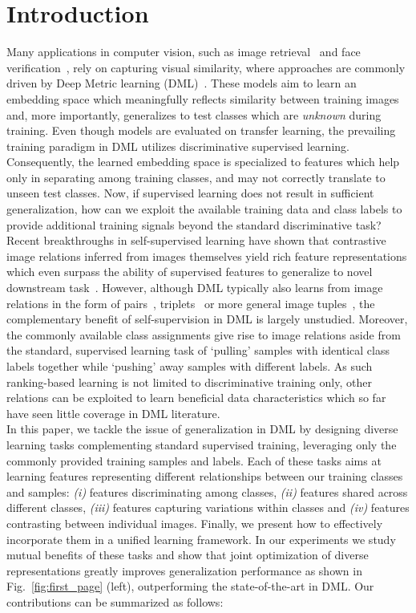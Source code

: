 \documentclass[runningheads]{llncs}
\begin{document}
\section{Introduction}
Many applications in computer vision, such as image retrieval~\cite{proxynca,dvml,margin} and face verification~\cite{semihard,npairs}, rely on capturing visual similarity, where approaches are commonly driven by Deep Metric learning (DML)~\cite{npairs,margin,proxynca}. These models aim to learn an embedding space which meaningfully reflects similarity between training images and, more importantly, generalizes to test classes which are \textit{unknown} during training. Even though models are evaluated on transfer learning, the prevailing training paradigm in DML utilizes discriminative supervised learning. Consequently, the learned embedding space is specialized to features which help only in separating among training classes, and may not correctly translate to unseen test classes. 
Now, if supervised learning does not result in sufficient generalization, how can we exploit the available training data and class labels to provide additional training signals beyond the standard discriminative task? 
\\
Recent breakthroughs in self-supervised learning have shown that contrastive image relations inferred from images themselves yield rich feature representations which even surpass the ability of supervised features to generalize to novel downstream task~\cite{cpc,moco,newhintonpaper}. However, although DML typically also learns from image relations in the form of pairs~\cite{contrastive}, triplets~\cite{margin,semihard} or more general image tuples~\cite{lifted,quadtruplet}, the complementary benefit of self-supervision in DML is largely unstudied. Moreover, the commonly available class assignments give rise to image relations aside from the standard, supervised learning task of `pulling' samples with identical class labels together while `pushing' away samples with different labels. As such ranking-based learning is not limited to discriminative training only, other relations can be exploited to learn beneficial data characteristics which so far have seen little coverage in DML literature.
\\
In this paper, we tackle the issue of generalization in DML by designing diverse learning tasks complementing standard supervised training, leveraging only the commonly provided training samples and labels. Each of these tasks aims at learning features representing different relationships between our training classes and samples: \textit{(i)} features discriminating among classes, \textit{(ii)} features shared across different classes, \textit{(iii)} features capturing variations within classes and \textit{(iv)} features contrasting between individual images. Finally, we present how to effectively incorporate them in a unified learning framework. In our experiments we study mutual benefits of these tasks and show that joint optimization of diverse representations greatly improves generalization performance as shown in Fig.~\ref{fig:first_page} (left), outperforming the state-of-the-art in DML. Our contributions can be summarized as follows:
\end{document}
